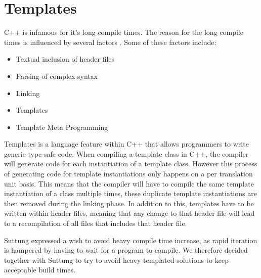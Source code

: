 \section{Templates}
\label{sec:requirements_templates}
C++ is infamous for it's long compile times. The reason for the long compile times is influenced by several factors
\cite{stack_overflow_why_does_cpp_compilation_take_so_long}.
Some of these factors include:
\begin{itemize}
    \item
    Textual inclusion of header files

    \item
    Parsing of complex syntax

    \item
    Linking

    \item
    Templates

    \item
    Template Meta Programming
\end{itemize}

Templates is a language feature within C++ that allows programmers to write generic type-safe code.
When compiling a template class in C++, the compiler will generate code for each instantiation of
a template class.
However this process of generating code for template instantiations only happens on a per translation unit basis.
This means that the compiler will have to compile the same template instantiation of a class multiple times,
these duplicate template instantiations are then removed during the linking phase.
In addition to this, templates have to be written within header files,
meaning that any change to that header file will lead to a recompilation of all files that includes that header file\cite{dr_dobbs_cpp_compilation_speed}.

Suttung expressed a wish to avoid heavy compile time increase, as rapid iteration is hampered by having to wait for a program to compile.
We therefore decided together with Suttung to try to avoid heavy templated solutions to keep acceptable build times.
